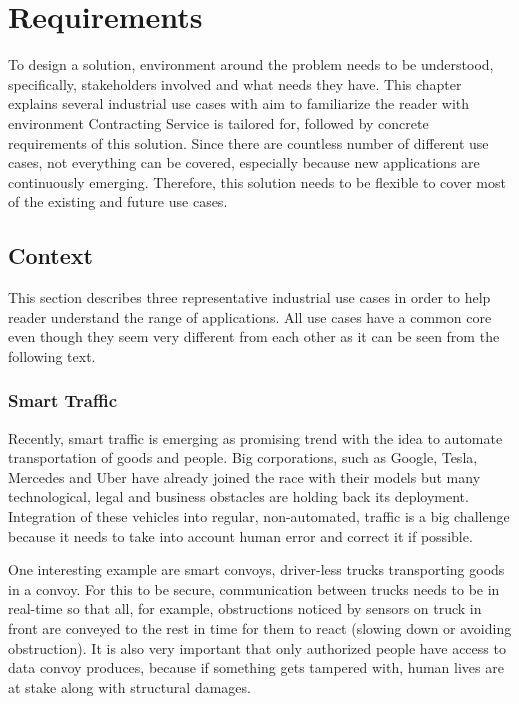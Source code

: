 \chapter{Requirements}

To design a solution, environment around the problem needs to be understood, specifically, stakeholders involved and what needs they have. This chapter explains several industrial use cases with aim to familiarize the reader with environment Contracting Service is tailored for, followed by concrete requirements of this solution. Since there are countless number of different use cases, not everything can be covered, especially because new applications are continuously emerging. Therefore, this solution needs to be flexible to cover most of the existing and future use cases.  

\section{Context}

This section describes three representative industrial use cases in order to help reader understand the range of applications. All use cases have a common core even though they seem very different from each other as it can be seen from the following text.

\subsection{Smart Traffic}

Recently, smart traffic is emerging as promising trend with the idea to automate transportation of goods and people. Big corporations, such as Google, Tesla, Mercedes and Uber have already joined the race with their models but many technological, legal and business obstacles are holding back its deployment. Integration of these vehicles into regular, non-automated, traffic is a big challenge because it needs to take into account human error and correct it if possible.

One interesting example are smart convoys, driver-less trucks transporting goods in a convoy. For this to be secure, communication between trucks needs to be in real-time so that all, for example, obstructions noticed by sensors on truck in front are conveyed to the rest in time for them to react (slowing down or avoiding obstruction). It is also very important that only authorized people have access to data convoy produces, because if something gets tampered with, human lives are at stake along with structural damages. 

